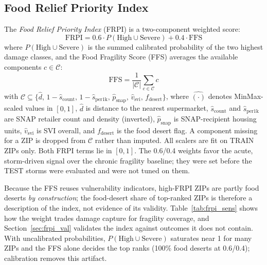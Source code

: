 \documentclass[conference]{IEEEtran}
\renewcommand{\_}{\origunderscore\allowbreak}
\begin{document}
\subsection{Food Relief Priority Index}

The \textit{Food Relief Priority Index} (FRPI) is a two-component
weighted score:
\begin{equation}
\text{FRPI} = 0.6 \cdot P(\text{High} \cup \text{Severe}) +
               0.4 \cdot \text{FFS}
\label{eq:frpi}
\end{equation}
where $P(\text{High} \cup \text{Severe})$ is the summed calibrated
probability of the two highest damage classes, and the Food
Fragility Score (FFS) averages the available components
$c \in \mathcal{C}$:
\begin{equation}
\text{FFS} = \frac{1}{|\mathcal{C}|}\sum_{c \in \mathcal{C}} c
\label{eq:ffs}
\end{equation}
with $\mathcal{C} \subseteq \{\hat{d},\, 1-\hat{s}_\text{count},\,
1-\hat{s}_\text{per1k},\, \hat{p}_\text{snap},\,
\hat{v}_\text{svi},\, f_\text{desert}\}$,
where $\hat{(\cdot)}$ denotes MinMax-scaled values in $[0,1]$,
$\hat{d}$ is distance to the nearest supermarket,
$\hat{s}_\text{count}$ and $\hat{s}_\text{per1k}$ are SNAP retailer
count and density (inverted), $\hat{p}_\text{snap}$ is
SNAP-recipient housing units, $\hat{v}_\text{svi}$ is SVI overall,
and $f_\text{desert}$ is the food desert flag. A component missing
for a ZIP is dropped from $\mathcal{C}$ rather than imputed. All
scalers are fit on TRAIN ZIPs only. Both FRPI terms lie in
$[0,1]$. The 0.6/0.4 weights favor the acute, storm-driven
signal over the chronic fragility baseline; they were set before
the TEST storms were evaluated and were not tuned on them.

Because the FFS reuses vulnerability indicators, high-FRPI ZIPs
are partly food deserts \textit{by construction}; the
food-desert share of top-ranked ZIPs is therefore a description
of the index, not evidence of its validity. Table~\ref{tab:frpi_sens}
shows how the weight trades damage capture for fragility
coverage, and Section~\ref{sec:frpi_val} validates the index
against outcomes it does not contain. With uncalibrated
probabilities, $P(\text{High}\cup\text{Severe})$ saturates near 1
for many ZIPs and the FFS alone decides the top ranks (100\%
food deserts at 0.6/0.4); calibration removes this artifact.
\end{document}
